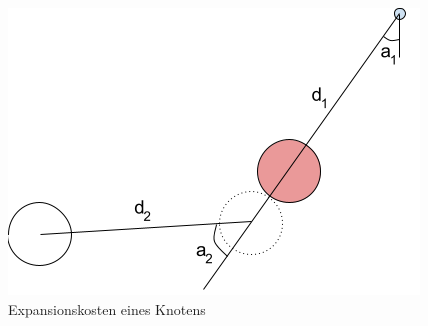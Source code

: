 \begin{figure}[h!]
    \begin{center}
        \includegraphics[width=0.5\linewidth]{../common/03_billiard_ai/resources/29_suchbaum_expansionskosten.png}
    \end{center}
    \caption{Expansionskosten eines Knotens}
    \label{fig:suche_knoten_expansionskosten}
\end{figure}

